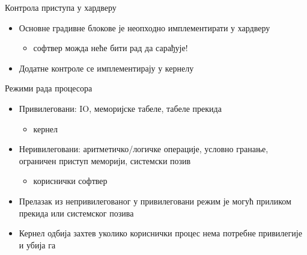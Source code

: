 \documentclass{beamer}
\begin{document}
    \begin{frame}[allowframebreaks]{Контрола приступа у хардверу}
        \begin{itemize}
            \item Основне градивне блокове је неопходно имплементирати у хардверу
            \begin{itemize}
                \item софтвер можда неће бити рад да сарађује!
            \end{itemize}
            \item Додатне контроле се имплементирају у кернелу
        \end{itemize}
        
        \framebreak
        
        \begin{figure}
            \centering
            \label{fig:ind}
        \end{figure}
    \end{frame}
    
    \begin{frame}{Режими рада процесора}
        \begin{itemize}
            \item Привилеговани: IO, меморијске табеле, табеле прекида
            \begin{itemize}
                \item кернел
            \end{itemize}
            \item Неривилеговани: аритметичко/логичке операције, условно гранање, ограничен приступ меморији, системски позив
            \begin{itemize}
                \item кориснички софтвер
            \end{itemize}
            \item Прелазак из непривилегованог у привилеговани режим је могућ приликом прекида или системског позива
            \item Кернел одбија захтев уколико кориснички процес нема потребне привилегије и убија га
        \end{itemize}
    \end{frame}
    
\end{document}
